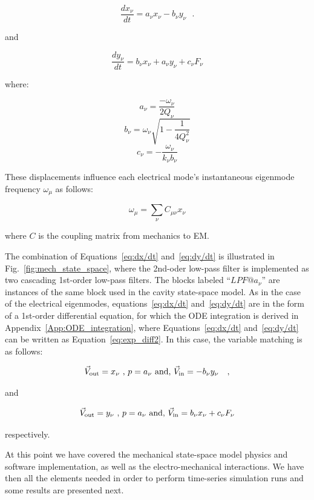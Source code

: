 \documentclass[a4paper,12pt]{article}
\newcommand{\be}{\begin{equation}}
\newcommand{\ee}{\end{equation}}
\begin{document}
\begin{equation}
  \frac{dx_{\nu}}{dt} = a_{\nu}x_{\nu} - b_{\nu}y_{\nu}~~~.
  \label{eq:dx/dt}
\end{equation}

\noindent and

\begin{equation}
  \frac{dy_{\nu}}{dt} = b_{\nu}x_{\nu} + a_{\nu}y_{\nu} + c_{\nu}F_{\nu}
  \label{eq:dy/dt}
\end{equation}

\noindent where: 

\be
a_{\nu} =  \frac{-\omega_{\nu}}{2Q_{\nu}} 
\ee
\be
b_{\nu} = \omega_{\nu} \sqrt{1 - \frac{1}{4Q_{\nu}^{2}}} 
\ee
\be
c_{\nu} = -\frac{\omega_{\nu}}{k_{\nu}b_{\nu}}
\ee

These displacements influence each electrical mode's instantaneous eigenmode frequency $\omega_{\mu}$ as follows:

\be
\omega_\mu = \sum_\nu C_{\mu\nu} x_\nu
\label{eq:sum_w_mu}
\ee

\noindent where $C$ is the coupling matrix from mechanics to EM.

The combination of Equations~\ref{eq:dx/dt} and~\ref{eq:dy/dt} is illustrated in Fig.~\ref{fig:mech_state_space}, where the 2nd-oder low-pass filter is implemented as two cascading 1st-order low-pass filters. The blocks labeled ``$LPF@a_{\nu}$'' are instances of the same block used in the cavity state-space model. As in the case of the electrical eigenmodes, equations~\ref{eq:dx/dt} and~\ref{eq:dy/dt} are in the form of a 1st-order differential equation, for which the ODE integration is derived in Appendix~\ref{App:ODE_integration}, where Equations~\ref{eq:dx/dt} and~\ref{eq:dy/dt} can be written as Equation~\ref{eq:exp_diff2}. In this case, the variable matching is as follows:

\begin{equation}
 \vec V_{\rm out} = x_{\nu} \mbox{ , } p = a_{\nu} \mbox{ and, } \vec V_{\rm in} = -b_{\nu}y_{\nu}~~~,
\end{equation}

\noindent and

\begin{equation}
 \vec V_{\rm out} = y_{\nu} \mbox{ , } p = a_{\nu} \mbox{ and, } \vec V_{\rm in} = b_{\nu}x_{\nu} + c_{\nu}F_{\nu}
\end{equation}

\noindent respectively.

At this point we have covered the mechanical state-space model physics and software implementation, as well as the electro-mechanical interactions. We have then all the elements needed in order to perform time-series simulation runs and some results are presented next.
\end{document}
